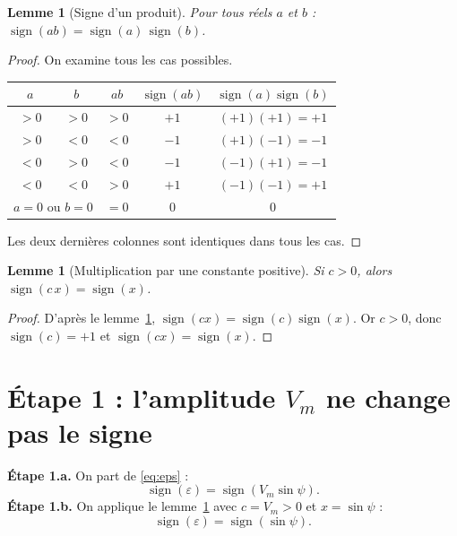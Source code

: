 \documentclass[11pt,a4paper]{article}
\numberwithin{equation}{section}
\theoremstyle{plain}
\newtheorem{lemme}[proposition]{Lemme}
\theoremstyle{definition}
\newcommand{\sign}{\operatorname{sign}}
\begin{document}
\begin{lemme}[Signe d'un produit]\label{lem:produit}
Pour tous réels $a$ et $b$ : $\sign(ab) = \sign(a)\,\sign(b)$.
\end{lemme}
\begin{proof}
On examine tous les cas possibles.
\begin{center}
\renewcommand{\arraystretch}{1.25}
\begin{tabular}{|c|c|c|c|c|}
\hline
$a$ & $b$ & $ab$ & $\sign(ab)$ & $\sign(a)\sign(b)$\\
\hline
$>0$ & $>0$ & $>0$ & $+1$ & $(+1)(+1)=+1$\\
$>0$ & $<0$ & $<0$ & $-1$ & $(+1)(-1)=-1$\\
$<0$ & $>0$ & $<0$ & $-1$ & $(-1)(+1)=-1$\\
$<0$ & $<0$ & $>0$ & $+1$ & $(-1)(-1)=+1$\\
\multicolumn{2}{|c|}{$a=0$ ou $b=0$} & $=0$ & $0$ & $0$\\
\hline
\end{tabular}
\end{center}
Les deux dernières colonnes sont identiques dans tous les cas.
\end{proof}

\begin{lemme}[Multiplication par une constante positive]\label{lem:const}
Si $c>0$, alors $\sign(c\,x) = \sign(x)$.
\end{lemme}
\begin{proof}
D'après le lemme~\ref{lem:produit}, $\sign(cx) = \sign(c)\sign(x)$. Or $c>0$, donc $\sign(c)=+1$
et $\sign(cx) = \sign(x)$.
\end{proof}

\section{Étape 1 : l'amplitude $V_m$ ne change pas le signe}

\textbf{Étape 1.a.} On part de \eqref{eq:eps} :
\begin{equation}
\sign(\varepsilon) = \sign(V_m\sin\psi).
\end{equation}
\textbf{Étape 1.b.} On applique le lemme~\ref{lem:const} avec $c=V_m>0$ et $x=\sin\psi$ :
\begin{equation}\label{eq:etape1}
\boxed{\sign(\varepsilon) = \sign(\sin\psi).}
\end{equation}
\end{document}
